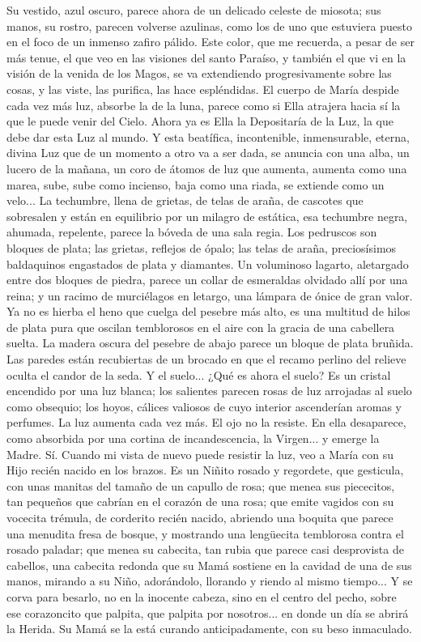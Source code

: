 \documentclass[12pt]{book} %
\begin{document}
Su vestido, azul oscuro, parece ahora de un delicado celeste de miosota; sus manos, su rostro, parecen volverse 
azulinas, como los de uno que estuviera puesto en el foco de un inmenso zafiro pálido. Este color, que me recuerda, a pesar de ser más tenue, el que veo en las visiones del santo Paraíso, y también el que vi en la visión de la venida de los Magos, se va extendiendo progresivamente sobre las cosas, y las viste, las purifica, las hace espléndidas. 
El cuerpo de María despide cada vez más luz, absorbe la de la luna, parece como si Ella atrajera hacia sí la que le puede 
venir del Cielo. Ahora ya es Ella la Depositaría de la Luz, la que debe dar esta Luz al mundo. Y esta beatífica, incontenible, inmensurable, eterna, divina Luz que de un momento a otro va a ser dada, se anuncia con una alba, un lucero de la mañana, un coro de átomos de luz que aumenta, aumenta como una marea, sube, sube como incienso, baja como una riada, se extiende como un velo... 
La techumbre, llena de grietas, de telas de araña, de cascotes que sobresalen y están en equilibrio por un milagro de 
estática, esa techumbre negra, ahumada, repelente, parece la bóveda de una sala regia. Los pedruscos son bloques de plata; las grietas, reflejos de ópalo; las telas de araña, preciosísimos baldaquinos engastados de plata y diamantes. Un voluminoso lagarto, aletargado entre dos bloques de piedra, parece un collar de esmeraldas olvidado allí por una reina; y un racimo de murciélagos en letargo, una lámpara de ónice de gran valor. Ya no es hierba el heno que cuelga del pesebre más alto, es una multitud de hilos de plata pura que oscilan temblorosos en el aire con la gracia de una cabellera suelta. 
La madera oscura del pesebre de abajo parece un bloque de plata bruñida. Las paredes están recubiertas de un brocado 
en que el recamo perlino del relieve oculta el candor de la seda. Y el suelo... ¿Qué es ahora el suelo? Es un cristal encendido por una luz blanca; los salientes parecen rosas de luz arrojadas al suelo como obsequio; los hoyos, cálices valiosos de cuyo interior ascenderían aromas y perfumes. 
La luz aumenta cada vez más. El ojo no la resiste. En ella desaparece, como absorbida por una cortina de 
incandescencia, la Virgen... y emerge la Madre.                  
Sí. Cuando mi vista de nuevo puede resistir la luz, veo a María con su Hijo recién nacido en los brazos. Es un Niñito rosado y regordete, que gesticula, con unas manitas del tamaño de un capullo de rosa; que menea sus piececitos, tan pequeños que cabrían en el corazón de una rosa; que emite vagidos con su vocecita trémula, de corderito recién nacido, abriendo una boquita que parece una menudita fresa de bosque, y mostrando una lengüecita temblorosa contra el rosado paladar; que menea su cabecita, tan rubia que parece casi desprovista de cabellos, una cabecita redonda que su Mamá sostiene en la cavidad de una de sus manos, mirando a su Niño, adorándolo, llorando y riendo al mismo tiempo... Y se corva para besarlo, no en la inocente cabeza, sino en el centro del pecho, sobre ese corazoncito que palpita, que palpita por nosotros... en donde un día se abrirá la Herida. Su Mamá se la está curando anticipadamente, con su beso inmaculado. 
\end{document}
